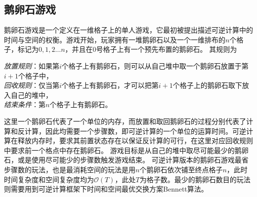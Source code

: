 \documentclass[A4,twoside,fontset=ubuntu,UTF8]{ctexart}
\newcommand{\bigO}{{\mathcal{O}}}
\begin{document}

\subsection{鹅卵石游戏}
鹅卵石游戏是一个定义在一维格子上的单人游戏，它最初被提出描述可逆计算中的时间与空间的权衡。游戏开始，玩家拥有一堆鹅卵石以及一个一维排布的$n$个格子，标记为$0,1,2\ldots n$，并且在$0$号格子上有一个预先布置的鹅卵石。
其规则为
\begin{tcolorbox}[width=\textwidth, title=鹅卵石游戏-可逆计算版本]
    \textit{放置规则}：如果第$i$个格子上有鹅卵石，则可以从自己堆中取一个鹅卵石放置于第$i+1$个格子中，\\
    \textit{回收规则}：仅当第$i$个格子上有鹅卵石，才可以把第$i+1$个格子上的鹅卵石取下放入自己的堆中，\\
    \textit{结束条件}：第$n$个格子上有鹅卵石。
\end{tcolorbox}
这里一个鹅卵石代表了一个单位的内存，而放置和取回鹅卵石的过程分别代表了计算和反计算，因此均需要一个步骤数，即可逆计算的一个单位的运算时间。可逆计算在释放内存时，要求其前置状态存在以保证反计算的可行，在这里对应回收规则中要求前一个格点中存在鹅卵石。
游戏目标是从自己的堆中取尽可能最少的鹅卵石，或是使用尽可能少的步骤数触发游戏结束。
可逆计算版本的鹅卵石游戏最省步骤数的玩法，也是最消耗空间的玩法是用$n$个鹅卵石依次铺至终点格子$n$，此时时间复杂度和空间复杂度均为$\bigO(T)$，此处$T$为格子数。最少的鹅卵石数目的玩法则需要用到可逆计算框架下时间和空间最优交换方案Bennett算法。
\end{document}
